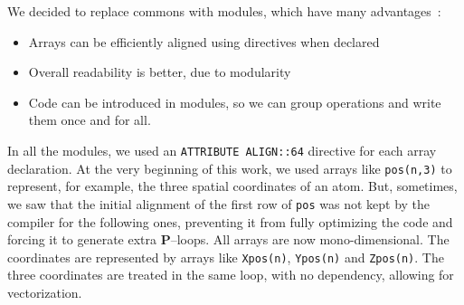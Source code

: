 \documentclass[9pt,comparison]{livecoms}
\newcommand{\lv}{\Large\verb}
\begin{document}
We decided to replace commons with modules, which have many advantages~:
\begin{itemize}
    \item Arrays can be efficiently aligned using directives when declared
    \item Overall readability is better, due to modularity
    \item Code can be introduced in modules, so we can group operations and write them once and for all.
\end{itemize}

In all the modules, we used an {\color{codepurple}\lv|ATTRIBUTE ALIGN::64|} directive for each array declaration. At the very beginning of this work, we used arrays like {\color{blue}\lv|pos(n,3)|} to represent, for example, the three spatial coordinates of an atom. But, sometimes, we saw that the initial alignment of the first row of {\color{blue}\lv|pos|} was not kept by the compiler for the following ones, preventing it from fully optimizing the code and forcing it to generate extra \textbf{P}--loops. All arrays are now mono-dimensional. The coordinates are represented by arrays like {\color{blue}\lv|Xpos(n)|}, {\color{blue}\lv|Ypos(n)|} and {\color{blue}\lv|Zpos(n)|}. The three coordinates are treated in the same loop, with no dependency, allowing for vectorization. 
 
\end{document}
